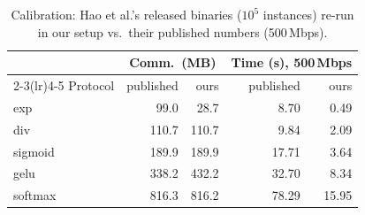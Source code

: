 \begin{table}[t]\centering\small
\caption{Calibration: Hao et al.'s released binaries ($10^5$ instances) re-run in our setup vs.\ their published numbers (500\,Mbps).}
\label{tab:hao}
\setlength{\tabcolsep}{4pt}
\begin{tabular}{lrrrr}\toprule
 & \multicolumn{2}{c}{Comm.\ (MB)} & \multicolumn{2}{c}{Time (s), 500\,Mbps}\\\cmidrule(lr){2-3}\cmidrule(lr){4-5}
Protocol & published & ours & published & ours\\\midrule
exp & 99.0 & 28.7 & 8.70 & 0.49\\
div & 110.7 & 110.7 & 9.84 & 2.09\\
sigmoid & 189.9 & 189.9 & 17.71 & 3.64\\
gelu & 338.2 & 432.2 & 32.70 & 8.34\\
softmax & 816.3 & 816.2 & 78.29 & 15.95\\
\bottomrule\end{tabular}
\end{table}
